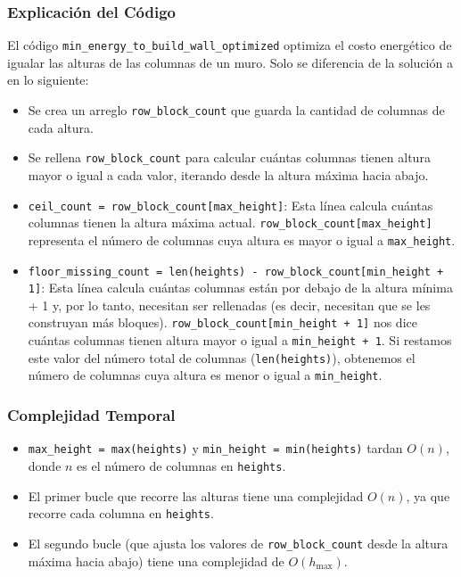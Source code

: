 \documentclass[a4paper,12pt]{article}
\begin{document}
\subsubsection{Explicación del Código}

El código \texttt{min\_energy\_to\_build\_wall\_optimized} optimiza el costo energético de igualar las alturas de las columnas de un muro. Solo se diferencia de la solución a en lo siguiente:

\begin{itemize}
	\item Se crea un arreglo \texttt{row\_block\_count} que guarda la cantidad de columnas de cada altura.
	\item Se rellena \texttt{row\_block\_count} para calcular cuántas columnas tienen altura mayor o igual a cada valor, iterando desde la altura máxima hacia abajo.
	\item \texttt{ceil\_count = row\_block\_count[max\_height]}: Esta línea calcula cuántas columnas tienen la altura máxima actual. \texttt{row\_block\_count[max\_height]} representa el número de columnas cuya altura es mayor o igual a \texttt{max\_height}.
	\item \texttt{floor\_missing\_count = len(heights) - row\_block\_count[min\_height + 1]}: Esta línea calcula cuántas columnas están por debajo de la altura mínima + 1 y, por lo tanto, necesitan ser rellenadas (es decir, necesitan que se les construyan más bloques). \texttt{row\_block\_count[min\_height + 1]} nos dice cuántas columnas tienen altura mayor o igual a \texttt{min\_height + 1}. Si restamos este valor del número total de columnas (\texttt{len(heights)}), obtenemos el número de columnas cuya altura es menor o igual a \texttt{min\_height}.
\end{itemize}

\subsubsection{Complejidad Temporal}

\begin{itemize}
	\item \texttt{max\_height = max(heights)} y \texttt{min\_height = min(heights)} tardan \(O(n)\), donde \(n\) es el número de columnas en \texttt{heights}.
	\item El primer bucle que recorre las alturas tiene una complejidad \(O(n)\), ya que recorre cada columna en \texttt{heights}.
	\item El segundo bucle (que ajusta los valores de \texttt{row\_block\_count} desde la altura máxima hacia abajo) tiene una complejidad de \(O(h_{\text{max}})\).
\end{itemize}
\end{document}
